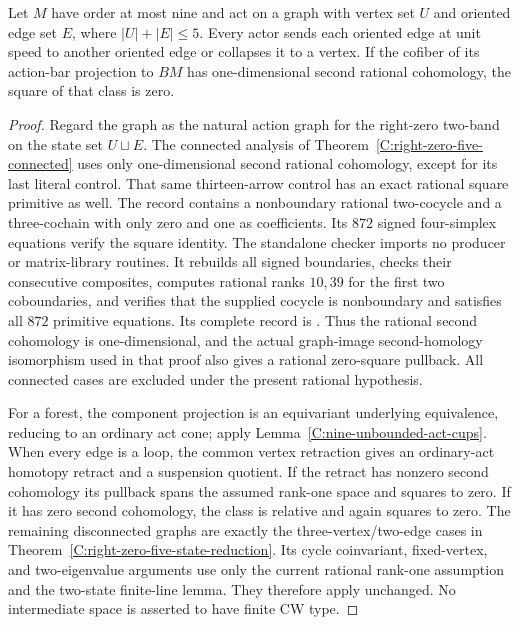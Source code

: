 \begin{lemma}
\label{C:nine-five-state-graph-square}
Let $M$ have order at most nine and act on a graph with vertex
set $U$ and oriented edge set $E$, where $|U|+|E|\leq5$.
Every actor sends each oriented edge at unit speed to another
oriented edge or collapses it to a vertex. If the cofiber of
its action-bar projection to $BM$ has one-dimensional second
rational cohomology, the square of that class is zero.
\end{lemma}
\begin{proof}
Regard the graph as the natural action graph for the right-zero
two-band on the state set $U\sqcup E$. The connected analysis
of Theorem~\ref{C:right-zero-five-connected} uses only
one-dimensional second rational cohomology, except for its
last literal control. That same thirteen-arrow control has
an exact rational square primitive as well.
The record
contains a nonboundary rational two-cocycle and a three-cochain
with only zero and one as coefficients. Its $872$ signed
four-simplex equations verify the square identity.
The standalone checker
imports no producer or matrix-library routines. It rebuilds
all signed boundaries, checks their consecutive composites,
computes rational ranks $10,39$ for the first two
coboundaries, and verifies that the supplied cocycle is
nonboundary and satisfies all $872$ primitive equations.
Its complete record is
.
Thus the rational second cohomology is one-dimensional,
and the actual graph-image second-homology
isomorphism used in that proof also gives a rational
zero-square pullback. All connected cases are excluded
under the present rational hypothesis.

For a forest, the component projection is an equivariant
underlying equivalence, reducing to an ordinary act cone;
apply Lemma~\ref{C:nine-unbounded-act-cups}.
When every edge is a loop, the common vertex retraction gives
an ordinary-act homotopy retract and a suspension quotient.
If the retract has nonzero second cohomology its pullback
spans the assumed rank-one space and squares to zero. If it
has zero second cohomology, the class is relative and again
squares to zero. The remaining disconnected graphs are
exactly the three-vertex/two-edge cases in
Theorem~\ref{C:right-zero-five-state-reduction}. Its cycle
coinvariant, fixed-vertex, and two-eigenvalue arguments use
only the current rational rank-one assumption and the
two-state finite-line lemma. They therefore apply unchanged.
No intermediate space is asserted to have finite CW type.
\end{proof}

